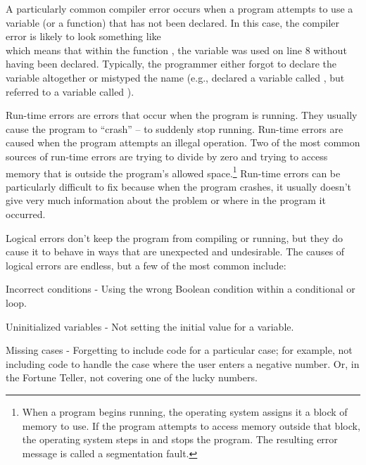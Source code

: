 A particularly common compiler error occurs when a program attempts to use a variable (or a function) that has not been declared.  In this case, the compiler error is likely to look something like\\
which means that within the function , the variable  was used on line 8 without having been declared.  Typically, the programmer either forgot to declare the variable altogether or mistyped the name (e.g., declared a variable called , but referred to a variable called ).  


Run-time errors are errors that occur when the program is running.  They usually cause the program to ``crash'' -- to suddenly stop running.  Run-time errors are caused when the program attempts an illegal operation.  Two of the most common sources of run-time errors are trying to divide by zero and trying to access memory that is outside the program's allowed space.\footnote{When a program begins running, the operating system assigns it a block of memory to use.  If the program attempts to access memory outside that block, the operating system steps in and stops the program.  The resulting error message is called a segmentation fault.}  Run-time errors can be particularly difficult to fix because when the program crashes, it usually doesn't give very much information about the problem or where in the program it occurred.  


Logical errors don't keep the program from compiling or running, but they do cause it to behave in ways that are unexpected and undesirable.  The causes of logical errors are endless, but a few of the most common include:
\begin{tight_itemize}
\item Incorrect conditions - Using the wrong Boolean condition within a conditional or loop.
\item Uninitialized variables - Not setting the initial value for a variable.
\item Missing cases - Forgetting to include code for a particular case; for example, not including code to handle the case where the user enters a negative number.  Or, in the Fortune Teller, not covering one of the lucky numbers.
\end{tight_itemize}

